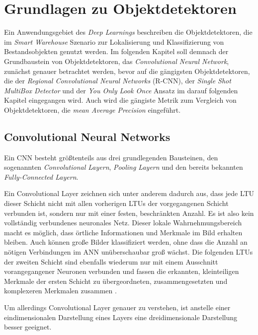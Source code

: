\section{Grundlagen zu Objektdetektoren}

Ein Anwendungsgebiet des \textit{Deep Learnings} beschreiben die Objektdetektoren, die im \textit{Smart Warehouse} Szenario zur Lokalisierung und Klassifizierung von Bestandsobjekten genutzt werden. Im folgenden Kapitel soll demnach der Grundbaustein von Objektdetektoren, das \textit{Convolutional Neural Network}, zunächst genauer betrachtet werden, bevor auf die gängigsten Objektdetektoren, die der \textit{Regional Convolutional Neural Networks} (R-CNN), der \textit{Single Shot MultiBox Detector} und der \textit{You Only Look Once} Ansatz im darauf folgenden Kapitel eingegangen wird. Auch wird die gängiste Metrik zum Vergleich von Objektdetektoren, die \textit{mean Average Precision} eingeführt.

\subsection*{Convolutional Neural Networks}

Ein CNN besteht größtenteils aus drei grundlegenden Bausteinen, den sogenannten \textit{Convolutional Layern}, \textit{Pooling Layern} und den bereits bekannten \textit{Fully-Connected Layern}.

Ein Convolutional Layer zeichnen sich unter anderem dadurch aus, dass jede LTU dieser Schicht nicht mit allen vorherigen LTUs der vorgegangenen Schicht verbunden ist, sondern nur mit einer festen, beschränkten Anzahl. Es ist also kein vollständig verbundenes neuronales Netz. Dieser \glqq lokale Wahrnehmungsbereich\grqq{} macht es möglich, dass örtliche Informationen und Merkmale im Bild erhalten bleiben. Auch können große Bilder klassifiziert werden, ohne dass die Anzahl an nötigen Verbindungen im ANN unüberschaubar groß wächst. Die folgenden LTUs der zweiten Schicht sind ebenfalls wiederum nur mit einem Ausschnitt vorangegangener Neuronen verbunden und fassen die erkannten, kleinteiligen Merkmale der ersten Schicht zu übergeordneten, zusammengesetzten und komplexeren Merkmalen zusammen \cite{AurelienGeron.2018}.

Um allerdings Convolutional Layer genauer zu verstehen, ist anstelle einer eindimensionalen Darstellung eines Layers eine dreidimensionale Darstellung besser geeignet.

